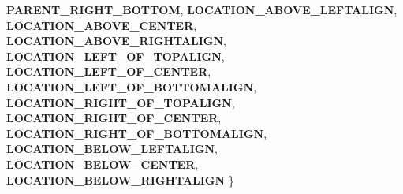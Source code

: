\begin{DoxyCompactItemize}
{\bfseries P\+A\+R\+E\+N\+T\+\_\+\+R\+I\+G\+H\+T\+\_\+\+B\+O\+T\+T\+OM}, 
\newline
{\bfseries L\+O\+C\+A\+T\+I\+O\+N\+\_\+\+A\+B\+O\+V\+E\+\_\+\+L\+E\+F\+T\+A\+L\+I\+GN}, 
{\bfseries L\+O\+C\+A\+T\+I\+O\+N\+\_\+\+A\+B\+O\+V\+E\+\_\+\+C\+E\+N\+T\+ER}, 
{\bfseries L\+O\+C\+A\+T\+I\+O\+N\+\_\+\+A\+B\+O\+V\+E\+\_\+\+R\+I\+G\+H\+T\+A\+L\+I\+GN}, 
{\bfseries L\+O\+C\+A\+T\+I\+O\+N\+\_\+\+L\+E\+F\+T\+\_\+\+O\+F\+\_\+\+T\+O\+P\+A\+L\+I\+GN}, 
\newline
{\bfseries L\+O\+C\+A\+T\+I\+O\+N\+\_\+\+L\+E\+F\+T\+\_\+\+O\+F\+\_\+\+C\+E\+N\+T\+ER}, 
{\bfseries L\+O\+C\+A\+T\+I\+O\+N\+\_\+\+L\+E\+F\+T\+\_\+\+O\+F\+\_\+\+B\+O\+T\+T\+O\+M\+A\+L\+I\+GN}, 
{\bfseries L\+O\+C\+A\+T\+I\+O\+N\+\_\+\+R\+I\+G\+H\+T\+\_\+\+O\+F\+\_\+\+T\+O\+P\+A\+L\+I\+GN}, 
{\bfseries L\+O\+C\+A\+T\+I\+O\+N\+\_\+\+R\+I\+G\+H\+T\+\_\+\+O\+F\+\_\+\+C\+E\+N\+T\+ER}, 
\newline
{\bfseries L\+O\+C\+A\+T\+I\+O\+N\+\_\+\+R\+I\+G\+H\+T\+\_\+\+O\+F\+\_\+\+B\+O\+T\+T\+O\+M\+A\+L\+I\+GN}, 
{\bfseries L\+O\+C\+A\+T\+I\+O\+N\+\_\+\+B\+E\+L\+O\+W\+\_\+\+L\+E\+F\+T\+A\+L\+I\+GN}, 
{\bfseries L\+O\+C\+A\+T\+I\+O\+N\+\_\+\+B\+E\+L\+O\+W\+\_\+\+C\+E\+N\+T\+ER}, 
{\bfseries L\+O\+C\+A\+T\+I\+O\+N\+\_\+\+B\+E\+L\+O\+W\+\_\+\+R\+I\+G\+H\+T\+A\+L\+I\+GN}
 \}
\end{DoxyCompactItemize}
